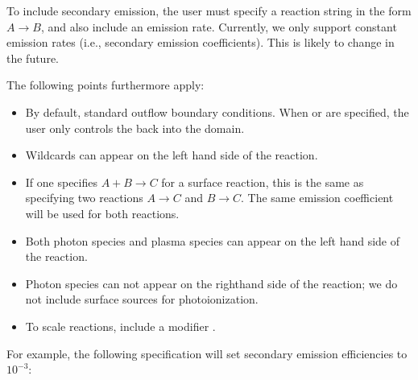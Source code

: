 \documentclass[letterpaper,10pt,english]{sphinxmanual}
\begin{document}
\sphinxAtStartPar
To include secondary emission, the user must specify a reaction string in the form \(A \rightarrow B\), and also include an emission rate.
Currently, we only support constant emission rates (i.e., secondary emission coefficients).
This is likely to change in the future.

\sphinxAtStartPar
The following points furthermore apply:
\begin{itemize}
\item {} 
\sphinxAtStartPar
By default, standard outflow boundary conditions.
When  or  are specified, the user only controls the  back into the domain.

\item {} 
\sphinxAtStartPar
Wildcards can appear on the left hand side of the reaction.

\item {} 
\sphinxAtStartPar
If one specifies \(A + B \rightarrow C\) for a surface reaction, this is the same as specifying two reactions \(A \rightarrow C\) and \(B\rightarrow C\).
The same emission coefficient will be used for both reactions.

\item {} 
\sphinxAtStartPar
Both photon species and plasma species can appear on the left hand side of the reaction.

\item {} 
\sphinxAtStartPar
Photon species can not appear on the right\sphinxhyphen{}hand side of the reaction; we do not include surface sources for photoionization.

\item {} 
\sphinxAtStartPar
To scale reactions, include a modifier .

\end{itemize}

\sphinxAtStartPar
For example, the following specification will set secondary emission efficiencies to \(10^{-3}\):
\end{document}
